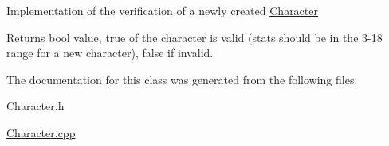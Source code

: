 Implementation of the verification of a newly created \hyperlink{classCharacter}{Character} \begin{DoxyReturn}{Returns}
bool value, true of the character is valid (stats should be in the 3-\/18 range for a new character), false if invalid. 
\end{DoxyReturn}


The documentation for this class was generated from the following files\+:\begin{DoxyCompactItemize}
\item 
Character.\+h\item 
\hyperlink{Character_8cpp}{Character.\+cpp}\end{DoxyCompactItemize}
